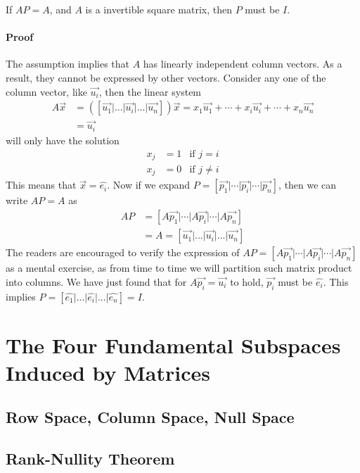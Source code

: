 \begin{thm}
If $AP = A$, and $A$ is a invertible square matrix, then $P$ must be $I$.
\paragraph{Proof}
The assumption implies that $A$ has linearly independent column vectors. As a result, they cannot be expressed by other vectors. Consider any one of the column vector, like $\vec{u_i}$, then the linear system
\begin{align*}
A\vec{x} &= ([\vec{u_1}|...|\vec{u_i}|...|\vec{u_n}])\vec{x} = x_1\vec{u_1} + \cdots + x_i\vec{u_i} + \cdots + x_n\vec{u_n} \\
&= \vec{u_i}
\end{align*}
will only have the solution
\begin{align*}
x_j &= 1 & \text{if $j = i$} \\
x_j &= 0 & \text{if $j \neq i$}
\end{align*}
This means that $\vec{x} = \hat{e_i}$. Now if we expand $P = [\vec{p_1}|\cdots|\vec{p_i}|\cdots|\vec{p_n}]$, then we can write $AP = A$ as
\begin{align*}
AP &= [A\vec{p_1}|\cdots|A\vec{p_i}|\cdots|A\vec{p_n}] \\
&= A = [\vec{u_1}|...|\vec{u_i}|...|\vec{u_n}]
\end{align*}
The readers are encouraged to verify the expression of $AP = [A\vec{p_1}|\cdots|A\vec{p_i}|\cdots|A\vec{p_n}]$ as a mental exercise, as from time to time we will partition such matrix product into columns. We have just found that for $A\vec{p_i} = \vec{u_i}$ to hold, $\vec{p_i}$ must be $\hat{e_i}$. This implies $P = [\hat{e_1}|...|\hat{e_i}|...|\hat{e_n}] = I$.
\end{thm}

\section{The Four Fundamental Subspaces Induced by Matrices}

\subsection{Row Space, Column Space, Null Space}

\subsection{Rank-Nullity Theorem}

